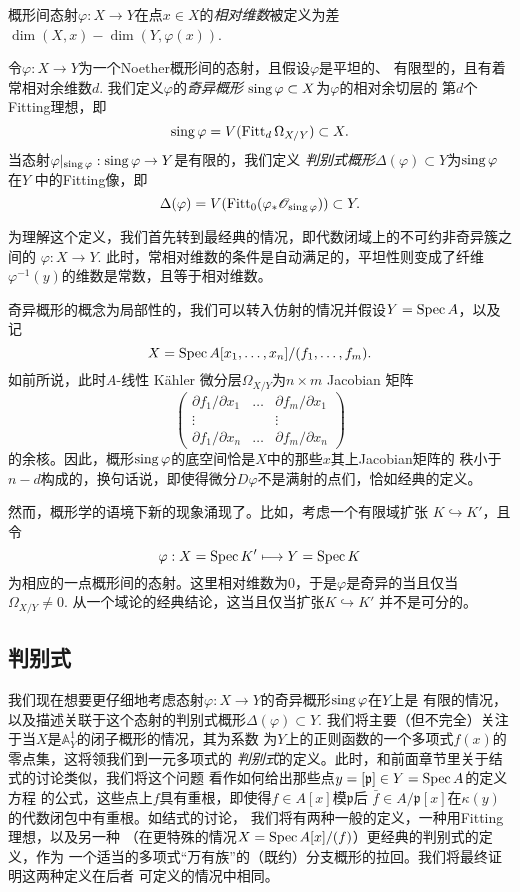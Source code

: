 概形间态射$\varphi:X\to Y$在点$x\in X$的\textit{相对维数}被定义为差
$\dim (X,x)-\dim(Y,\varphi(x))$.

\begin{defi}\label{defi:5.21}
    令$\varphi:X\to Y$为一个Noether概形间的态射，且假设$\varphi$是平坦的、
    有限型的，且有着常相对余维数$d$. 我们定义$\varphi$的\textit{奇异概形}
    $\operatorname{sing}\varphi\subset X$为$\varphi$的相对余切层的
    第$d$个Fitting理想，即
    \[
        \operatorname{sing}\varphi=V(\operatorname{Fitt}_d \Omega_{X/Y})\subset X.
    \]
    当态射$\varphi|_{\operatorname{sing} \varphi}:\operatorname{sing} \varphi\to Y$是有限的，我们定义
    \textit{判别式概形}$\Delta(\varphi)\subset Y$为$\operatorname{sing} \varphi$在$Y$
    中的Fitting像，即
    \[
        \Delta(\varphi)=V(\operatorname{Fitt}_0(\varphi_* \mathscr{O}_{\operatorname{sing} \varphi})) 
        \subset Y.
    \]
\end{defi}

为理解这个定义，我们首先转到最经典的情况，即代数闭域上的不可约非奇异簇之间的
$\varphi:X\to Y$. 此时，常相对维数的条件是自动满足的，平坦性则变成了纤维
$\varphi^{-1}(y)$的维数是常数，且等于相对维数。

奇异概形的概念为局部性的，我们可以转入仿射的情况并假设$Y=\operatorname{Spec} A$，以及记
\[
    X=\operatorname{Spec} A[x_1, \ldots, x_n] /(f_1, \ldots, f_m).
\]
如前所说，此时$A$-线性 K\"ahler 微分层$\Omega_{X/Y}$为$n\times m$ Jacobian
矩阵
\[
    \begin{pmatrix}
        \partial f_1 / \partial x_1 & \ldots & \partial f_m / \partial x_1 \\
        \vdots & & \vdots \\
        \partial f_1 / \partial x_n & \ldots & \partial f_m / \partial x_n
    \end{pmatrix}
\]
的余核。因此，概形$\operatorname{sing} \varphi$的底空间恰是$X$中的那些$x$其上Jacobian矩阵的
秩小于$n-d$构成的，换句话说，即使得微分$D\varphi$不是满射的点们，恰如经典的定义。

然而，概形学的语境下新的现象涌现了。比如，考虑一个有限域扩张
$K\hookrightarrow K'$，且令
\[
    \varphi: X=\operatorname{Spec} K^{\prime} \longmapsto Y=\operatorname{Spec} K
\]
为相应的一点概形间的态射。这里相对维数为$0$，于是$\varphi$是奇异的当且仅当
$\Omega_{X/Y}\neq 0$. 从一个域论的经典结论，这当且仅当扩张$K\hookrightarrow K'$
并不是可分的。


\subsection{判别式}

我们现在想要更仔细地考虑态射$\varphi:X\to Y$的奇异概形$\operatorname{sing} \varphi$在$Y$上是
有限的情况，以及描述关联于这个态射的判别式概形$\Delta(\varphi)\subset Y$. 
我们将主要（但不完全）关注于当$X$是$\mathbb A_Y^1$的闭子概形的情况，其为系数
为$Y$上的正则函数的一个多项式$f(x)$的零点集，这将领我们到一元多项式的
\textit{判别式}的定义。此时，和前面章节里关于结式的讨论类似，我们将这个问题
看作如何给出那些点$y=[\mathfrak p]\in Y=\operatorname{Spec} A$的定义方程
的公式，这些点上$f$具有重根，即使得$f\in A[x]$模$\mathfrak p$后
$\bar f\in A/\mathfrak p[x]$在$\kappa (y)$的代数闭包中有重根。如结式的讨论，
我们将有两种一般的定义，一种用Fitting理想，以及另一种
（在更特殊的情况$X=\operatorname{Spec} A[x]/(f)$）更经典的判别式的定义，作为
一个适当的多项式“万有族”的（既约）分支概形的拉回。我们将最终证明这两种定义在后者
可定义的情况中相同。

